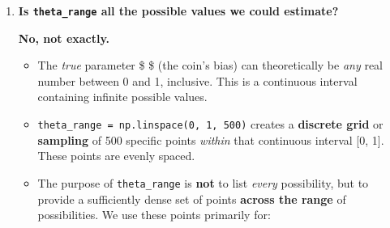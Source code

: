 \documentclass[11pt]{article}
\providecommand{\tightlist}{%
      \setlength{\itemsep}{0pt}\setlength{\parskip}{0pt}}
\begin{document}
\begin{enumerate}
  \begin{itemize}
  \tightlist
  \item
    \textbf{Plotting:} To visualize these distributions (e.g., plotting
    the prior belief about \$ \theta \$ , or the final posterior
    distribution), we need to calculate the value of the PDF (or
    likelihood) at many different \$ \theta \$ values across its valid
    range {[}0, 1{]}. \texttt{theta\_range} provides these x-axis
    values. Using 500 points helps create smooth-looking curves when
    plotted.
  \item
    \textbf{Numerical Integration (Potentially):} While not explicitly
    used for integration \emph{in this specific snippet}, if we needed
    to calculate quantities like the evidence \$ p(D\textbar M) \$
    numerically (instead of using an analytical formula), we would
    integrate the product of the likelihood and prior over the range of
    \$ \theta \$ . \texttt{theta\_range} could serve as the points for
    numerical integration methods (like the trapezoidal rule, although
    \texttt{scipy.integrate.quad} is often better).
  \end{itemize}

  In short, \texttt{theta\_range} creates a fine grid of possible values
  for the coin's bias \$ \theta \$ between 0 and 1, primarily so we can
  calculate and plot the shapes of the probability distributions
  involved in the Bayesian analysis.
\item
  \textbf{Is \texttt{theta\_range} all the possible values we could
  estimate?}

  \textbf{No, not exactly.}

  \begin{itemize}
  \tightlist
  \item
    The \emph{true} parameter \$ \theta \$ (the coin's bias) can
    theoretically be \emph{any} real number between 0 and 1, inclusive.
    This is a continuous interval containing infinite possible values.
  \item
    \texttt{theta\_range\ =\ np.linspace(0,\ 1,\ 500)} creates a
    \textbf{discrete grid} or \textbf{sampling} of 500 specific points
    \emph{within} that continuous interval {[}0, 1{]}. These points are
    evenly spaced.
  \item
    The purpose of \texttt{theta\_range} is \textbf{not} to list
    \emph{every} possibility, but to provide a sufficiently dense set of
    points \textbf{across the range} of possibilities. We use these
    points primarily for:


\end{itemize}
\end{enumerate}
\end{document}
